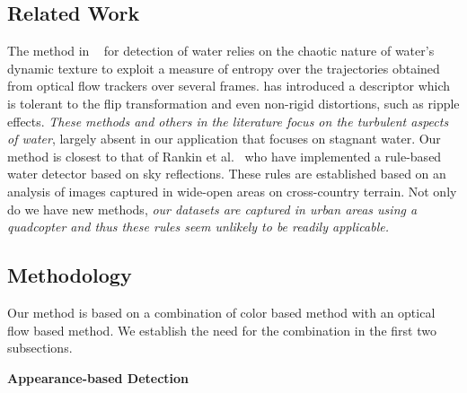\documentclass[11pt]{article}
\begin{document}
\subsection{Related Work}
The method in ~\cite{santana12} for detection of
water relies on the chaotic nature of water's dynamic texture to
exploit a measure of entropy over the trajectories obtained from
optical flow trackers over several frames. \cite{zhang10} has
introduced a descriptor which is tolerant to the flip transformation
and even non-rigid distortions, such as ripple effects.  \emph{These
  methods and others in the literature focus on the turbulent aspects
  of water}, largely absent in our application that focuses on
stagnant water.  Our method is closest to that of Rankin et
al.~\cite{rankin2004daytime, rankin11} who have implemented a rule-based water
detector based on sky reflections.  These rules are established
based on an analysis of images captured in wide-open areas on
cross-country terrain. Not only do we have new methods, \emph{our
datasets are captured in urban areas using a quadcopter and thus these
rules seem unlikely to be readily applicable.}

\subsection{Methodology}
Our method is based on a combination of color based method with an optical flow
based method.  We establish the need for the combination in the first two subsections.
\vspace{0.5cm}

\noindent\textbf{Appearance-based Detection}
\end{document}

